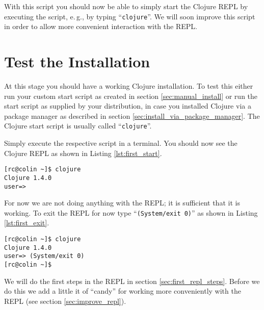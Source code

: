 With this script you should now be able to simply start the Clojure REPL by executing the script, e.\,g., by typing ``\texttt{clojure}''.
We will soon improve this script in order to allow more convenient interaction with the REPL.

\section{Test the Installation}
\label{sec:test_clojure_installation}
At this stage you should have a working Clojure installation.
To test this either run your custom start script as created in section \vref{sec:manual_install} or run the start script as supplied by your distribution, in case you installed Clojure via a package manager as described in section \vref{sec:install_via_package_manager}.
The Clojure start script is usually called ``\texttt{clojure}''.

Simply execute the respective script in a terminal.
You should now see the Clojure REPL as shown in Listing \vref{lst:first_start}.

\begin{lstlisting}[label=lst:first_start, caption=First Start of the Clojure REPL]
[rc@colin ~]$ clojure 
Clojure 1.4.0
user=>
\end{lstlisting}

For now we are not doing anything with the REPL;
it is sufficient that it is working.
To exit the REPL for now type ``\texttt{(System/exit 0)}'' as shown in Listing \vref{lst:first_exit}.

\begin{lstlisting}[label=lst:first_exit, caption=Leave the REPL for now]
[rc@colin ~]$ clojure 
Clojure 1.4.0
user=> (System/exit 0)
[rc@colin ~]$
\end{lstlisting}

We will do the first steps in the REPL in section \vref{sec:first_repl_steps}.
Before we do this we add a little it of ``candy'' for working more conveniently with the REPL (see section \vref{sec:improve_repl}).

